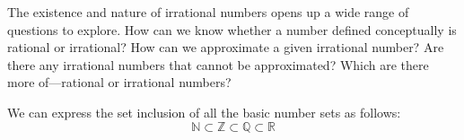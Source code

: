 \begin{advancedTopic}
  The existence and nature of irrational numbers opens up a wide range of questions to explore. How can we know
  whether a number defined conceptually is rational or irrational? How can we approximate a given irrational
  number? Are there any irrational numbers that cannot be approximated? Which are there more of—rational or
  irrational numbers?
\end{advancedTopic}

We can express the set inclusion of all the basic number sets as follows:
\[
  \mathbb{N} \subset \mathbb{Z} \subset \mathbb{Q} \subset \mathbb{R}
\]

